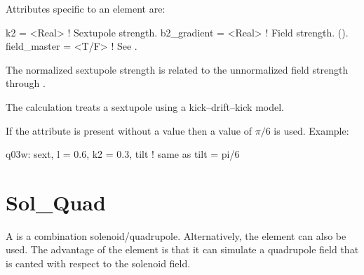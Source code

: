 {
Attributes specific to an  element are:
\begin{example}
  k2          = <Real>   ! Sextupole strength.
  b2_gradient = <Real>   ! Field strength. ().
  field_master = <T/F>    ! See .
\end{example}
The normalized sextupole  strength is related to the unnormalized  field
strength through .

The  calculation treats a sextupole using a kick--drift--kick model.

If the  attribute is present without a value then a value of 
$\pi/6$ is used.
Example:
\begin{example}
  q03w: sext, l = 0.6, k2 = 0.3, tilt  ! same as tilt = pi/6
\end{example}

\newpage

\section{Sol_Quad}
\label{s:sq}

A  is a combination solenoid/quadrupole. Alternatively, the  element
can also be used. The advantage of the  element is that it can simulate a
quadrupole field that is canted with respect to the solenoid field.

}

